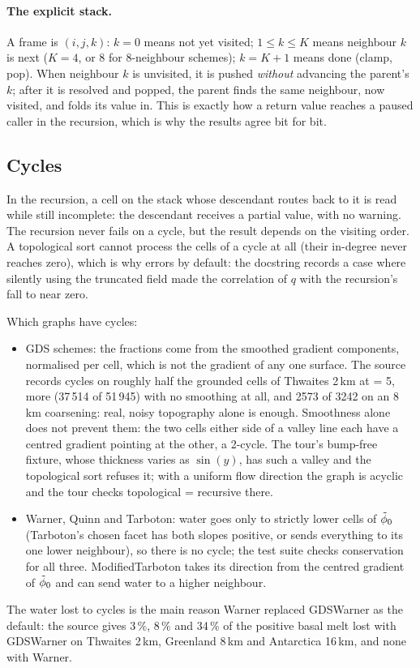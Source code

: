 \paragraph{The explicit stack.} A frame is $(i, j, k)$: $k = 0$ means not yet visited; $1\le k\le K$ means neighbour $k$ is next
($K = 4$, or 8 for 8-neighbour schemes); $k = K+1$ means done (clamp, pop). When neighbour $k$ is unvisited, it is pushed
\emph{without} advancing the parent's $k$; after it is resolved and popped, the parent finds the same neighbour, now visited,
and folds its value in. This is exactly how a return value reaches a paused caller in the recursion, which is why the
results agree bit for bit.

\subsection{Cycles}\label{rt:cycles}
In the recursion, a cell on the stack whose descendant routes back to it is read while still incomplete: the descendant
receives a partial value, with no warning. The recursion never fails on a cycle, but the result depends on the visiting
order. A topological sort cannot process the cells of a cycle at all (their in-degree never reaches zero), which is why
 errors by default: the docstring records a case where silently using the truncated field made the
correlation of $q$ with the recursion's fall to near zero.

Which graphs have cycles:
\begin{itemize}[leftmargin=1.5em]
\item GDS schemes: the fractions come from the smoothed gradient components, normalised per cell, which is not the gradient of
  any one surface. The source records cycles on roughly half the grounded cells of Thwaites 2\,km at  = 5,
  more (37\,514 of 51\,945) with no smoothing at all, and 2573 of 3242 on an 8\,km coarsening: real, noisy topography alone is
  enough. Smoothness alone does not prevent them: the two cells either side of a valley line each have a centred
  gradient pointing at the other, a 2-cycle. The tour's bump-free fixture, whose thickness varies as $\sin(y)$, has
  such a valley and the topological sort refuses it; with a uniform flow direction the graph is acyclic and the tour
  checks topological = recursive there.
\item Warner, Quinn and Tarboton: water goes only to strictly lower cells of ${\tilde\phi_0}$ (Tarboton's chosen facet has both slopes
  positive, or sends everything to its one lower neighbour), so there is no cycle; the test suite checks conservation for all
  three. ModifiedTarboton takes its direction from the centred gradient of ${\tilde\phi_0}$ and can send water to a higher neighbour.
\end{itemize}
The water lost to cycles is the main reason Warner replaced GDSWarner as the default: the source gives 3\,\%, 8\,\% and 34\,\% of
the positive basal melt lost with GDSWarner on Thwaites 2\,km, Greenland 8\,km and Antarctica 16\,km, and none with Warner.

